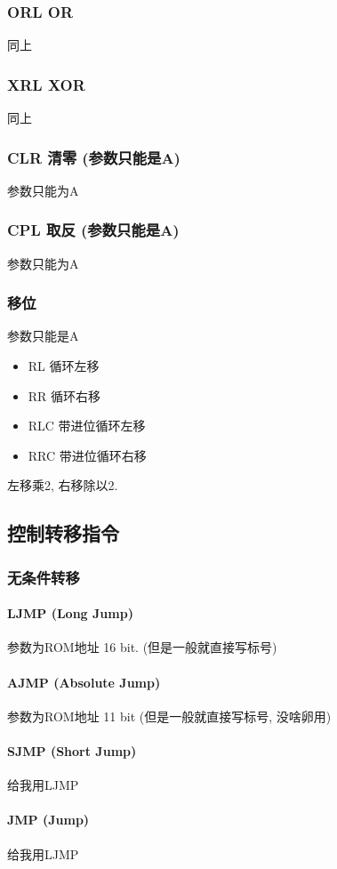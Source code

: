 \documentclass[a4paper]{report}
\begin{document}
\subsubsection{ORL OR}
同上
\subsubsection{XRL XOR}
同上
\subsubsection{CLR 清零 (参数只能是A)}
参数只能为A
\subsubsection{CPL 取反 (参数只能是A)}
参数只能为A
\subsubsection{移位}
参数只能是A
\begin{itemize}
  \item RL 循环左移
  \item RR 循环右移
  \item RLC 带进位循环左移
  \item RRC 带进位循环右移
\end{itemize}
左移乘2, 右移除以2. 
\subsection{控制转移指令}
\subsubsection{无条件转移}
\paragraph{LJMP (Long Jump)}
参数为ROM地址 16 bit. (但是一般就直接写标号)
\paragraph{AJMP (Absolute Jump)}
参数为ROM地址 11 bit (但是一般就直接写标号, 没啥卵用)
\paragraph{SJMP (Short Jump)} 给我用LJMP
\paragraph{JMP (Jump)} 给我用LJMP
\end{document}
